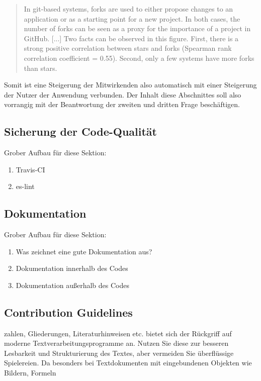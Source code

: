 \begin{quote}
  In git-based systems, forks are used to either propose changes to an application or as
a starting point for a new project. In both cases, the number of forks can be seen as a proxy
for the importance of a project in GitHub. [...] Two facts can be observed in this figure. First, there is a strong positive
correlation between stars and forks (Spearman rank correlation coefficient = 0.55). Second,
only a few systems have more forks than stars.
\end{quote}

Somit ist eine Steigerung der Mitwirkenden also automatisch mit einer Steigerung der Nutzer der Anwendung verbunden. Der Inhalt diese Abschnittes soll also vorrangig mit der Beantwortung der zweiten und dritten Frage beschäftigen.

\subsection{Sicherung der Code-Qualität}
Grober Aufbau für diese Sektion:

\begin{enumerate}
  \item Travis-CI
  \item es-lint
\end{enumerate}

\subsection{Dokumentation}
Grober Aufbau für diese Sektion:

\begin{enumerate}
  \item Was zeichnet eine gute Dokumentation aus?
  \item Dokumentation innerhalb des Codes
  \item Dokumentation außerhalb des Codes
\end{enumerate}


\subsection{Contribution Guidelines}
zahlen, Gliederungen, Literaturhinweisen etc. bietet sich der Rückgriff
auf moderne Textverarbeitungsprogramme an. Nutzen Sie diese zur besseren Lesbarkeit
und Strukturierung des Textes, aber vermeiden Sie überflüssige Spielereien. Da
besonders bei Textdokumenten mit eingebundenen Objekten wie Bildern, Formeln


